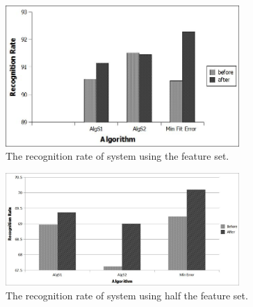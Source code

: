 \documentclass[10pt]{article}
\begin{document}
 
    \begin{figure}
  \centering
  \includegraphics[width=3.5in]{Experiment92.jpg}
  \caption[Recognition accuracy]%
  {The recognition rate of system using the feature set.}
   \label{exp2}
\end{figure}
\begin{figure}
  \centering
  \includegraphics[width=3.5in]{Experiment68.jpg}
  \caption[Recognition accuracy]%
  {The recognition rate of system using half the feature set.}
   \label{exp1}
\end{figure}

 
\end{document}
